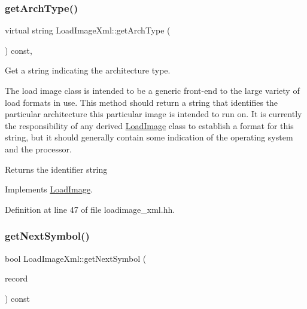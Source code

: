 \subsubsection{\texorpdfstring{getArchType()}{getArchType()}}
{\footnotesize\ttfamily virtual string Load\+Image\+Xml\+::get\+Arch\+Type (\begin{DoxyParamCaption}\item[{void}]{ }\end{DoxyParamCaption}) const\hspace{0.3cm}{\ttfamily [inline]}, {\ttfamily [virtual]}}



Get a string indicating the architecture type. 

The load image class is intended to be a generic front-\/end to the large variety of load formats in use. This method should return a string that identifies the particular architecture this particular image is intended to run on. It is currently the responsibility of any derived \mbox{\hyperlink{class_load_image}{Load\+Image}} class to establish a format for this string, but it should generally contain some indication of the operating system and the processor. \begin{DoxyReturn}{Returns}
the identifier string 
\end{DoxyReturn}


Implements \mbox{\hyperlink{class_load_image_a5103418147e95994f66e77746c0a0cfc}{Load\+Image}}.



Definition at line 47 of file loadimage\+\_\+xml.\+hh.

\mbox{\label{class_load_image_xml_ab0a1e2aee8d5d8925e29662f32fa2060}} 
\subsubsection{\texorpdfstring{getNextSymbol()}{getNextSymbol()}}
{\footnotesize\ttfamily bool Load\+Image\+Xml\+::get\+Next\+Symbol (\begin{DoxyParamCaption}\item[{\mbox{\hyperlink{struct_load_image_func}{Load\+Image\+Func}} \&}]{record }\end{DoxyParamCaption}) const\hspace{0.3cm}{\ttfamily [virtual]}}



